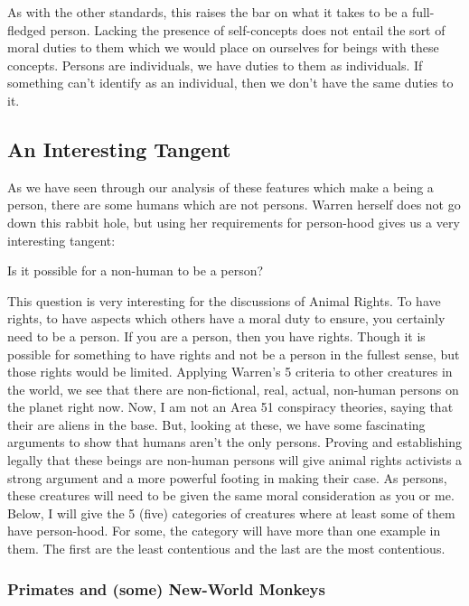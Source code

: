 As with the other standards, this raises the bar on what it takes to be a full-fledged person. Lacking the presence of self-concepts does not entail the sort of moral duties to them which we would place on ourselves for beings with these concepts. Persons are individuals, we have duties to them as individuals. If something can't identify as an individual, then we don't have the same duties to it. 

\subsection{An Interesting Tangent}

As we have seen through our analysis of these features which make a being a person, there are some humans which are not persons. Warren herself does not go down this rabbit hole, but using her requirements for person-hood gives us a very interesting tangent:
\begin{center}Is it possible for a non-human to be a person?\end{center}

This question is very interesting for the discussions of Animal Rights. To have rights, to have aspects which others have a moral duty to ensure, you certainly need to be a person. If you are a person, then you have rights. Though it is possible for something to have rights and not be a person in the fullest sense, but those rights would be limited. Applying Warren's 5 criteria to other creatures in the world, we see that there are non-fictional, real, actual, non-human persons on the planet right now. Now, I am not an Area 51 conspiracy theories, saying that their are aliens in the base. But, looking at these, we have some fascinating arguments to show that humans aren't the only persons. Proving and establishing legally that these beings are non-human persons will give animal rights activists a strong argument and a more powerful footing in making their case. As persons, these creatures will need to be given the same moral consideration as you or me. 
Below, I will give the 5 (five) categories of creatures where at least some of them have person-hood. For some, the category will have more than one example in them. The first are the least contentious and the last are the most contentious. 
\subsubsection{Primates and (some) New-World Monkeys}

